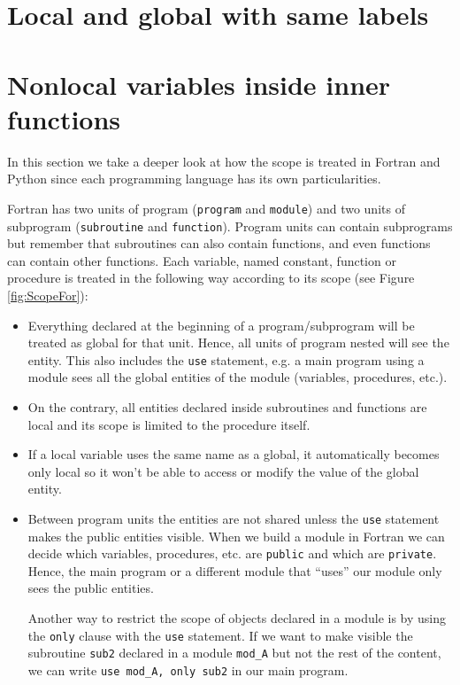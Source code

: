     \section{Local and global with same labels}




    \section{Nonlocal variables inside inner functions} 



In this section we take a deeper look at how the scope is treated in Fortran and Python since each programming language has its own particularities. 

Fortran has two units of program (\texttt{program} and \texttt{module}) and two units of subprogram (\texttt{subroutine} and \texttt{function}).
Program units can contain subprograms but remember that subroutines can also contain functions, and even functions can contain other functions. 
Each variable, named constant, function or procedure is treated in the following way according to its scope (see Figure \ref{fig:ScopeFor}):
\begin{itemize}
    \item Everything declared at the beginning of a program/subprogram will be treated as global for that unit. 
    Hence, all units of program nested will see the entity.
    This also includes the \texttt{use} statement, e.g. a main program using a module sees all the global entities of the module (variables, procedures, etc.). 
    
    \item On the contrary, all entities declared inside subroutines and functions are local and its scope is limited to the procedure itself. 
    
    \item If a local variable uses the same name as a global, it automatically becomes only local so it won't be able to access or modify the value of the global entity. 
    
    \item Between program units the entities are not shared unless the \texttt{use} statement makes the public entities visible. 
    When we build a module in Fortran we can decide which variables, procedures, etc. are \texttt{public} and which are \texttt{private}. 
    Hence, the main program or a different module that ``uses'' our module only sees the public entities.
    
    Another way to restrict the scope of objects declared in a module is by using the \texttt{only} clause with the \texttt{use} statement. 
    If we want to make visible the subroutine \texttt{sub2} declared in a module \texttt{mod\_A} but not the rest of the content, we can write \texttt{use mod\_A, only sub2} in our main program. 
\end{itemize}

